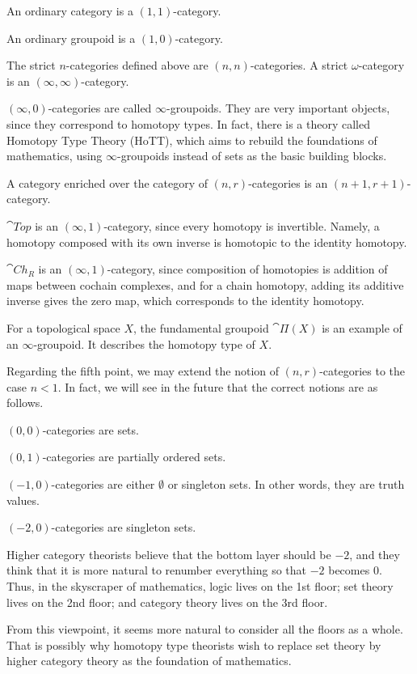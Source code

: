 \begin{itms}
    \item An ordinary category is a $(1,1)$-category.
    \item An ordinary groupoid is a $(1,0)$-category.
    \item The strict $n$-categories defined above are $(n,n)$-categories.
    A strict $\omega$-category is an $(\infty,\infty)$-category.
    \item $(\infty,0)$-categories are called $\infty$-groupoids.
    They are very important objects, since they correspond to homotopy types.
    In fact, there is a theory called Homotopy Type Theory (HoTT),
    which aims to rebuild the foundations of mathematics,
    using $\infty$-groupoids instead of sets as the basic building blocks.
    \item A category enriched over the category of $(n,r)$-categories
    is an $(n+1,r+1)$-category.
    \item $\cat{Top}$ is an $(\infty,1)$-category,
    since every homotopy is invertible.
    Namely, a homotopy composed with its own inverse
    is homotopic to the identity homotopy.
    \item $\cat{Ch}_R$ is an $(\infty,1)$-category,
    since composition of homotopies is addition of
    maps between cochain complexes,
    and for a chain homotopy,
    adding its additive inverse gives the zero map,
    which corresponds to the identity homotopy.
    \item For a topological space $X$,
    the fundamental groupoid $\cat{Π}(X)$ is
    an example of an $\infty$-groupoid.
    It describes the homotopy type of $X$.
\end{itms}

Regarding the fifth point,
we may extend the notion of $(n,r)$-categories to the case $n<1$.
In fact, we will see in the future
that the correct notions are as follows.
\begin{itms}
    \item $(0,0)$-categories are sets.
    \item $(0,1)$-categories are partially ordered sets.
    \item $(-1,0)$-categories are either $\emptyset$ or singleton sets. In other words, they are truth values.
    \item $(-2,0)$-categories are singleton sets.
\end{itms}

Higher category theorists believe that
the bottom layer should be $-2$,
and they think that it is more natural to renumber everything
so that $-2$ becomes $0$.
Thus, in the skyscraper of mathematics,
logic lives on the 1st floor;
set theory lives on the 2nd floor;
and category theory lives on the 3rd floor.

From this viewpoint,
it seems more natural to consider all the floors as a whole.
That is possibly why homotopy type theorists wish to replace set theory by
higher category theory as the foundation of mathematics.
